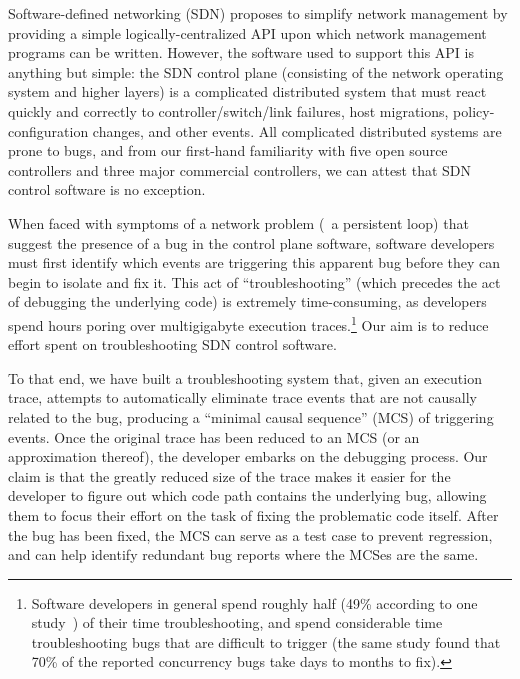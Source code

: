 Software-defined networking (SDN) proposes to simplify network management by
providing a simple logically-centralized API upon which network management
programs can be written. However, the software used to support this API is
anything but simple: the SDN control plane (consisting of the network
operating system and higher layers) is a complicated distributed system that
must react quickly and correctly to controller/switch/link failures, host migrations,
policy-configuration changes, and other events.
All complicated distributed systems are prone to bugs, and from our first-hand
familiarity with five open source controllers and three major commercial
controllers, we can attest that SDN control software is no exception.

When faced with symptoms of a network problem (\eg~a persistent loop)
that suggest the presence of a bug in the control plane software,
software developers must first identify which events are triggering
this apparent bug before they can begin to isolate and fix it.
This act of ``troubleshooting'' (which precedes the act of debugging the
underlying code) is extremely time-consuming, as developers spend hours poring
over multigigabyte execution traces.\footnote{Software developers in general spend roughly half (49\% according to one
study~\cite{msoft_concurrency}) of their time troubleshooting, and spend
considerable time troubleshooting bugs that are difficult to trigger (the same study found
that 70\% of the reported concurrency bugs take days to months to fix).}
Our aim is to reduce effort spent on troubleshooting SDN control software.


To that end, we have built a troubleshooting system that,
given an execution trace, attempts to automatically eliminate
trace events that are not causally related to the bug, producing a ``minimal
causal sequence'' (MCS) of triggering events. Once the original trace has
been reduced to an MCS (or an approximation thereof), the developer embarks
on the debugging process. Our claim is that the greatly reduced size of the
trace makes it easier for the developer to figure out which code path contains
the underlying bug, allowing them to focus their effort on
the task of fixing the problematic code itself. After the bug has been fixed, the MCS
can serve as a test case to prevent regression,
and can help identify redundant bug reports where the MCSes are the same.

